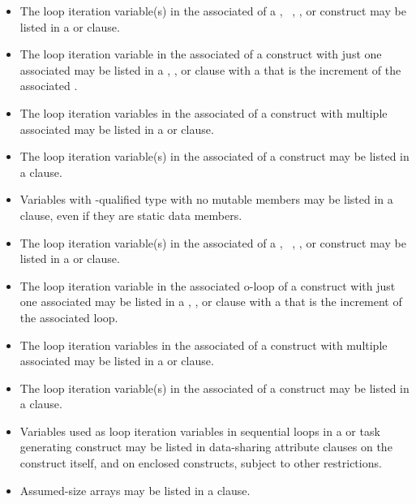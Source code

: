 \begin{ccppspecific}
\begin{itemize}
\item The loop iteration variable(s) in the associated  of a 
      , ~, , or  
      construct may be listed in a  or  clause.
\item The loop iteration variable in the associated  of a 
       construct with just one associated  may be 
      listed in a , , or  clause 
      with a  that is the increment of the associated .
\item The loop iteration variables in the associated  of a 
       construct with multiple associated  may be 
      listed in a  or  clause.
\item The loop iteration variable(s) in the associated  of 
      a  construct may be listed in a  clause.
\item Variables with -qualified type with no mutable members may 
      be listed in a  clause, even if they are static data members.
\end{itemize}
\end{ccppspecific}

\begin{fortranspecific}
\begin{itemize}
\item The loop iteration variable(s) in the associated  of a 
      , ~, , or 
      construct may be listed in a  or  clause.
\item The loop iteration variable in the associated o-loop of a  
      construct with just one associated  may be listed in a 
      , , or  clause with a 
       that is the increment of the associated loop.
\item The loop iteration variables in the associated  of a 
       construct with multiple associated  may be 
      listed in a  or  clause.
\item The loop iteration variable(s) in the associated  of 
      a  construct may be listed in a  clause.
\item Variables used as loop iteration variables in sequential loops in a 
       or task generating construct may be listed in 
      data-sharing attribute clauses on the construct itself, and on
      enclosed constructs, subject to other restrictions.
\item Assumed-size arrays may be listed in a  clause.
\end{itemize}
\end{fortranspecific}

